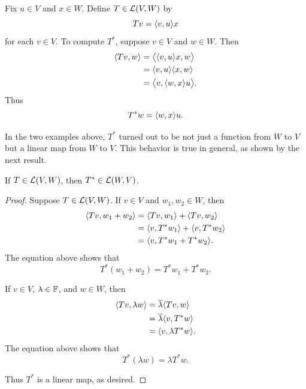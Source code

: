 \begin{example}%
\label{ax:7.3}
Fix $u\in V$ and $x\in W$. Define $T\in\mathcal{L}(V,W)$ by
\[ Tv = \langle v, u \rangle x \]
for each $v\in V$. To compute $T^*$, suppose $v\in V$ and $w\in W$. Then
\begin{align*}
\langle Tv, w \rangle &= \bigl\langle \langle v, u \rangle x,w\bigr\rangle\\
           &= \langle v, u \rangle\langle x, w \rangle\\
           &= \bigl\langle v,\langle w, x \rangle u\bigr\rangle.
\end{align*}
Thus
\[ T^*w = \langle w, x \rangle u. \]
\end{example}

%
In the two examples above, $T^*$ turned out to be not just a function from $W$
to $V$ but a linear map from $W$ to $V$. This behavior is true in general, as
shown by the next result.

\begin{result}\label{ax:7.4}
If $T\in\mathcal{L}(V,W)$, then $T^*\in\mathcal{L}(W,V)$.
\end{result}

\begin{proof}
Suppose $T\in\mathcal{L}(V,W)$. If $v\in V$ and $w_1,w_2\in W$, then
\begin{align*}
\langle Tv, w_1+w_2 \rangle &= \langle Tv, w_1 \rangle+\langle Tv, w_2 \rangle\\
                 &= \langle v, T^*w_1 \rangle+\langle v, T^*w_2 \rangle\\
                 &= \langle v, T^*w_1+T^*w_2 \rangle.
\end{align*}
The equation above shows that
\[ T^*(w_1+w_2) = T^*w_1+T^*w_2. \]

If $v\in V$, $\lambda\in\mathbb{F}$, and $w\in W$, then
\begin{align*}
\langle Tv, \lambda w \rangle &= \overline{\lambda}\langle Tv, w \rangle\\
                   &= \overline{\lambda}\langle v, T^*w \rangle\\
                   &= \langle v, \lambda T^*w \rangle.
\end{align*}
The equation above shows that
\[ T^*(\lambda w) = \lambda T^*w. \]

Thus $T^*$ is a linear map, as desired.
\end{proof}

